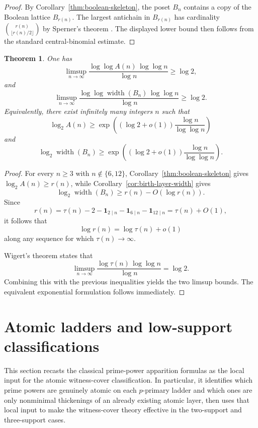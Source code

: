 \documentclass[11pt,letterpaper]{article}
\numberwithin{equation}{section}
\theoremstyle{plain}
\newtheorem{theorem}{Theorem}[section]
\theoremstyle{definition}
\theoremstyle{remark}
\DeclareMathOperator{\widthop}{width}
\begin{document}
\begin{proof}
By Corollary~\ref{thm:boolean-skeleton}, the poset $B_n$ contains a copy of the
Boolean lattice $B_{r(n)}$. The largest antichain in $B_{r(n)}$ has cardinality
$\binom{r(n)}{\lfloor r(n)/2\rfloor}$ by Sperner's theorem
\cite{Sperner1928Subsets}. The displayed lower bound then follows from the
standard central-binomial estimate.
\end{proof}

\begin{theorem}
\label{thm:birth-layer-maximal-order}
One has
\[
\limsup_{n\to\infty}
\frac{\log\log A(n)\,\log\log n}{\log n}\ge \log 2,
\]
and
\[
\limsup_{n\to\infty}
\frac{\log\log \widthop(B_n)\,\log\log n}{\log n}\ge \log 2.
\]
Equivalently, there exist infinitely many integers $n$ such that
\[
\log_2 A(n)\ge
\exp\!\left((\log 2+o(1))\frac{\log n}{\log\log n}\right)
\]
and
\[
\log_2 \widthop(B_n)\ge
\exp\!\left((\log 2+o(1))\frac{\log n}{\log\log n}\right).
\]
\end{theorem}

\begin{proof}
For every $n\ge 3$ with $n\notin\{6,12\}$,
Corollary~\ref{thm:boolean-skeleton} gives $\log_2 A(n)\ge r(n)$, while
Corollary~\ref{cor:birth-layer-width} gives
\[
\log_2 \widthop(B_n)\ge r(n)-O(\log r(n)).
\]
Since
\[
r(n)=\tau(n)-2-\mathbf{1}_{2\mid n}-\mathbf{1}_{6\mid n}-\mathbf{1}_{12\mid n}
=\tau(n)+O(1),
\]
it follows that
\[
\log r(n)=\log \tau(n)+o(1)
\]
along any sequence for which $\tau(n)\to\infty$.

Wigert's theorem \cite{Wigert1907Divisors} states that
\[
\limsup_{n\to\infty}\frac{\log \tau(n)\,\log\log n}{\log n}=\log 2.
\]
Combining this with the previous inequalities yields the two limsup bounds.
The equivalent exponential formulation follows immediately.
\end{proof}

\section{Atomic ladders and low-support classifications}
\label{sec:atomic-ladders}

This section recasts the classical prime-power apparition formulas as the local
input for the atomic witness-cover classification. In particular, it identifies
which prime powers are genuinely atomic on each $p$-primary ladder and which
ones are only nonminimal thickenings of an already existing atomic layer, then
uses that local input to make the witness-cover theory effective in the
two-support and three-support cases.
\end{document}
